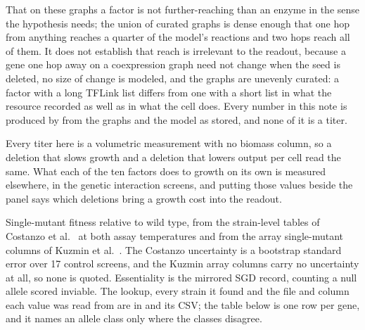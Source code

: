  That on these graphs a factor is not further-reaching than
an enzyme in the sense the hypothesis needs; the union of curated graphs is dense enough
that one hop from anything reaches a quarter of the model's reactions and two hops reach
all of them. It does not establish that reach is irrelevant to the readout, because a gene
one hop away on a coexpression graph need not change when the seed is deleted, no size of
change is modeled, and the graphs are unevenly curated: a factor with a long TFLink list
differs from one with a short list in what the resource recorded as well as in what the
cell does. Every number in this note is produced by
 from the graphs and
the model as stored, and none of it is a titer.


\begin{figure}[t]
\end{figure}


Every titer here is a volumetric measurement with no biomass column, so a deletion that
slows growth and a deletion that lowers output per cell read the same. What each of the
ten factors does to growth on its own is measured elsewhere, in the genetic interaction
screens, and putting those values beside the panel says which deletions bring a growth
cost into the readout.

 Single-mutant fitness relative to wild type, from
the strain-level tables of Costanzo et al.~\citep{costanzoGlobalGeneticInteraction2016} at
both assay temperatures and from the array single-mutant columns of Kuzmin et
al.~\citep{kuzminSystematicAnalysisComplex2018,kuzminExploringWholegenomeDuplicate2020}.
The Costanzo uncertainty is a bootstrap standard error over 17 control screens, and the
Kuzmin array columns carry no uncertainty at all, so none is quoted. Essentiality is the
mirrored SGD record, counting a null allele scored inviable. The lookup, every strain it
found and the file and column each value was read from are in
 and its CSV; the
table below is one row per gene, and it names an allele class only where the classes
disagree.

